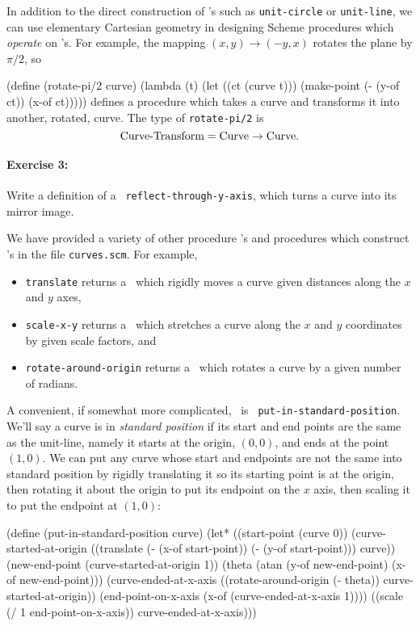 In addition to the direct construction of \CRV's such as {\tt unit-circle}
or {\tt unit-line}, we can use elementary Cartesian geometry in designing
Scheme procedures which {\em operate} on \CRV's.  For example, the mapping
$(x,y)\longrightarrow (-y,x)$ rotates the plane by $\pi/2$, so

\beginlisp
(define (rotate-pi/2 curve)
  (lambda (t)
    (let ((ct (curve t)))
      (make-point
       (- (y-of ct))
       (x-of ct)))))
\endlisp
defines a procedure which takes a curve and transforms it into another,
rotated, curve.  The type of {\tt rotate-pi/2} is
\[\mbox{Curve-Transform} = \mbox{Curve} \rightarrow \mbox{Curve}.\]

\paragraph{Exercise 3:}
Write a definition of a \UT\ {\tt reflect-through-y-axis}, which turns a
curve into its mirror image.

\medskip

We have provided a variety of other procedure \UT's and procedures which
construct \UT's in the file {\tt curves.scm}.  For example,
\begin{itemize}

\item
{\tt translate} returns a \UT\ which rigidly moves a curve given distances
along the $x$ and $y$ axes,

\item {\tt scale-x-y}
returns a \UT\ which stretches a curve along the $x$ and $y$ coordinates
by given scale factors, and

\item {\tt rotate-around-origin}
returns a \UT\ which rotates a curve by a given number of radians.

\end{itemize}
A convenient, if somewhat more complicated, \UT\ is {\tt
put-in-standard-position}.  We'll say a curve is in {\em standard
position} if its start and end points are the same as the unit-line,
namely it starts at the origin, $(0,0)$, and ends at the point $(1,0)$.
We can put any curve whose start and endpoints are not the same into
standard position by rigidly translating it so its starting point is at
the origin, then rotating it about the origin to put its endpoint on the
$x$ axis, then scaling it to put the endpoint at $(1,0)$:

\beginlisp
(define (put-in-standard-position curve)
  (let* ((start-point (curve 0))
         (curve-started-at-origin
          ((translate (- (x-of start-point))
                      (- (y-of start-point)))
           curve))
         (new-end-point (curve-started-at-origin 1))
         (theta (atan (y-of new-end-point) (x-of new-end-point)))
         (curve-ended-at-x-axis
          ((rotate-around-origin (- theta)) curve-started-at-origin))
         (end-point-on-x-axis (x-of (curve-ended-at-x-axis 1))))
    ((scale (/ 1 end-point-on-x-axis)) curve-ended-at-x-axis)))
\endlisp

